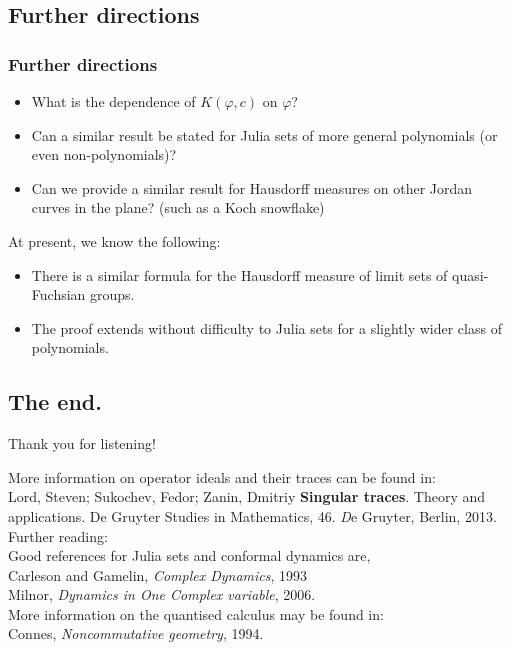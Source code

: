 \documentclass{beamer} %
\theoremstyle{definition} %
\def\qd{\,{\mathchar'26\mkern-12mu d}}
\begin{document}
\subsection{Further directions}
\begin{frame}\frametitle{Further directions}
    \begin{itemize}
        \item{} What is the dependence of $K(\varphi,c)$ on $\varphi$?
        \item{} Can a similar result be stated for Julia sets of more general polynomials (or even non-polynomials)?
        \item{} Can we provide a similar result for Hausdorff measures on other Jordan curves in the plane? (such as a Koch snowflake)
    \end{itemize}  
    
    \pause
    At present, we know the following:
    \begin{itemize}
        \item{} There is a similar formula for the Hausdorff measure of limit sets of quasi-Fuchsian groups.
        \item{} The proof extends without difficulty to Julia sets for a slightly wider class of polynomials.
    \end{itemize}
\end{frame}

\subsection{The end.}
\begin{frame}
    Thank you for listening!
    
    More information on operator ideals and their traces can be found in:\\
    Lord, Steven; Sukochev, Fedor; Zanin, Dmitriy {\bf Singular traces}. Theory and applications. De Gruyter Studies in Mathematics, 46. {\emph De Gruyter, Berlin}, 2013.\\
    
    Further reading:\\
    Good references for Julia sets and conformal dynamics are,\\
    Carleson and Gamelin, \emph{ Complex Dynamics}, 1993\\
    Milnor, \emph{Dynamics in One Complex variable}, 2006.\\
    
    More information on the quantised calculus may be found in:\\
    Connes, \emph{Noncommutative geometry}, 1994.
\end{frame}
\end{document}
